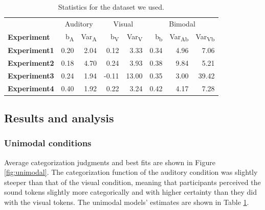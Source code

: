 \documentclass[english,,man,floatsintext]{apa6}
\theoremstyle{definition}
\theoremstyle{definition}
\theoremstyle{definition}
\theoremstyle{remark}
\begin{document}
\begin{table}

\caption{\label{tab:param}Statistics for the dataset we used.}
\centering
\begin{tabular}[t]{>{\bfseries}lrrrrrrr}
\toprule
\multicolumn{1}{c}{} & \multicolumn{2}{c}{Auditory} & \multicolumn{2}{c}{Visual} & \multicolumn{3}{c}{Bimodal} \\
\cmidrule(l{2pt}r{2pt}){2-3} \cmidrule(l{2pt}r{2pt}){4-5} \cmidrule(l{2pt}r{2pt}){6-8}
Experiment & b\textsubscript{A} & Var\textsubscript{A} & b\textsubscript{V} & Var\textsubscript{V} & b\textsubscript{b} & Var\textsubscript{Ab} & Var\textsubscript{Vb}\\
\midrule
Experiment1 & 0.20 & 2.04 & 0.12 & 3.33 & 0.34 & 4.96 & 7.06\\
Experiment2 & 0.18 & 4.70 & 0.24 & 3.93 & 0.38 & 9.84 & 5.21\\
Experiment3 & 0.24 & 1.94 & -0.11 & 13.00 & 0.35 & 3.00 & 39.42\\
Experiment4 & 0.40 & 1.92 & 0.22 & 3.24 & 0.42 & 4.17 & 7.28\\
\bottomrule
\end{tabular}
\end{table}

\subsection{Results and analysis}\label{results-and-analysis}

\subsubsection{Unimodal conditions}\label{unimodal-conditions-1}

Average categorization judgments and best fits are shown in Figure
\ref{fig:unimodal}. The categorization function of the auditory
condition was slightly steeper than that of the visual condition,
meaning that participants perceived the sound tokens slightly more
categorically and with higher certainty than they did with the visual
tokens. The unimodal models' estimates are shown in Table
\ref{tab:param}.
\end{document}
